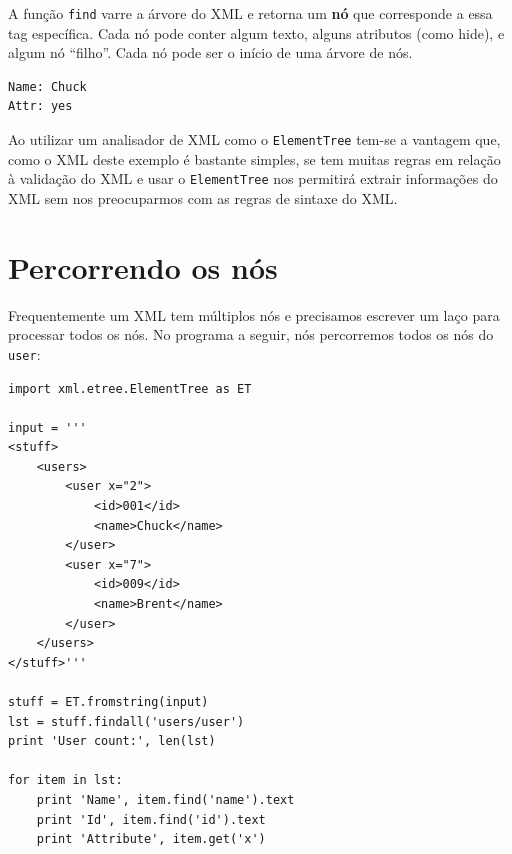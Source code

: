 A função {\tt find} varre a árvore do XML
e retorna um {\bf nó} que corresponde a essa tag específica.
Cada nó pode conter algum texto, alguns atributos (como hide), e
algum nó ``filho''. Cada nó pode ser o início de uma árvore de nós.

\beforeverb
\begin{verbatim}
Name: Chuck
Attr: yes
\end{verbatim}
\afterverb

Ao utilizar um analisador de XML como o {\tt ElementTree} tem-se a
vantagem que, como o XML deste exemplo é bastante simples, 
se tem muitas regras em relação à validação do XML e usar o 
{\tt ElementTree} nos permitirá extrair informações do XML sem
nos preocuparmos com as regras de sintaxe do XML.

\section{Percorrendo os nós}

Frequentemente um XML tem múltiplos nós e precisamos escrever
um laço para processar todos os nós. No programa a seguir,
nós percorremos todos os nós do {\tt user}:

\beforeverb
\begin{verbatim}
import xml.etree.ElementTree as ET

input = '''
<stuff>
    <users>
        <user x="2">
            <id>001</id>
            <name>Chuck</name>
        </user>
        <user x="7">
            <id>009</id>
            <name>Brent</name>
        </user>
    </users>
</stuff>'''

stuff = ET.fromstring(input)
lst = stuff.findall('users/user')
print 'User count:', len(lst)

for item in lst:
    print 'Name', item.find('name').text
    print 'Id', item.find('id').text
    print 'Attribute', item.get('x')
\end{verbatim}
\afterverb

